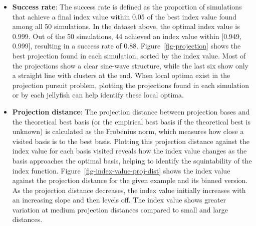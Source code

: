 \documentclass[
  number,
  preprint,
  3p]{elsarticle}
\begin{document}
\begin{itemize}
\item
  \textbf{Success rate}: The success rate is defined as the proportion
  of simulations that achieve a final index value within 0.05 of the
  best index value found among all 50 simulations. In the dataset above,
  the optimal index value is 0.999. Out of the 50 simulations, 44
  achieved an index value within {[}0.949, 0.999{]}, resulting in a
  success rate of 0.88. Figure~\ref{fig-projection} shows the best
  projection found in each simulation, sorted by the index value. Most
  of the projections show a clear sine-wave structure, while the last
  six show only a straight line with clusters at the end. When local
  optima exist in the projection pursuit problem, plotting the
  projections found in each simulation or by each jellyfish can help
  identify these local optima.
\item
  \textbf{Projection distance}: The projection distance between
  projection bases and the theoretical best basis (or the empirical best
  basis if the theoretical best is unknown) is calculated as the
  Frobenius norm, which measures how close a visited basis is to the
  best basis. Plotting this projection distance against the index value
  for each basis visited reveals how the index value changes as the
  basis approaches the optimal basis, helping to identify the
  squintability of the index function.
  Figure~\ref{fig-index-value-proj-dist} shows the index value against
  the projection distance for the given example and its binned version.
  As the projection distance decreases, the index value initially
  increases with an increasing slope and then levels off. The index
  value shows greater variation at medium projection distances compared
  to small and large distances.
\end{itemize}
\end{document}
